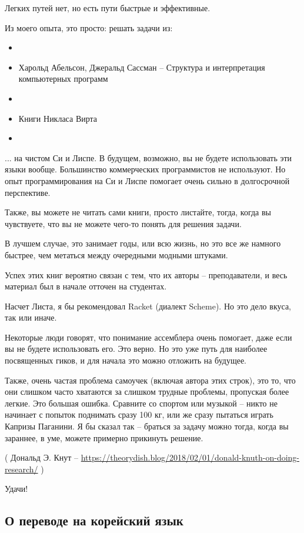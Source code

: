 Легких путей нет, но есть пути быстрые и эффективные.

Из моего опыта, это просто: решать задачи из:

\begin{itemize}
\item \KRBook
\item Харольд Абельсон, Джеральд Сассман -- Структура и интерпретация компьютерных программ
\item \TAOCP
\item Книги Никласа Вирта
\item \RobPikePractice
\end{itemize}

... на чистом Си и Лиспе.
В будущем, возможно, вы не будете использовать эти языки вообще.
Большинство коммерческих программистов не используют. Но опыт программирования на Си и Лиспе помогает очень сильно в 
долгосрочной перспективе.

Также, вы можете не читать сами книги, просто листайте, тогда, когда вы чувствуете, что вы не можете чего-то
понять для решения задачи.

В лучшем случае, это занимает годы, или всю жизнь, но это все же намного быстрее, чем метаться между очередными модными
штуками.

Успех этих книг вероятно связан с тем, что их авторы -- преподаватели, и весь материал был в начале отточен на студентах.

Насчет Листа, я бы рекомендовал Racket (диалект Scheme). Но это дело вкуса, так или иначе.

Некоторые люди говорят, что понимание ассемблера очень помогает, даже если вы не будете использовать его.
Это верно.
Но это уже путь для наиболее посвященных гиков, и для начала это можно отложить на будущее.

Также, очень частая проблема самоучек (включая автора этих строк), это то, что они слишком часто хватаются
за слишком трудные проблемы, пропуская более легкие.
Это большая ошибка.
Сравните со спортом или музыкой -- никто не начинает с попыток поднимать сразу 100 кг,
или же сразу пытаться играть Капризы Паганини.
Я бы сказал так -- браться за задачу можно тогда, когда вы зараннее, в уме, можете примерно прикинуть решение.


( Дональд Э. Кнут -- \url{https://theorydish.blog/2018/02/01/donald-knuth-on-doing-research/} )

Удачи!

\subsection*{О переводе на корейский язык}

